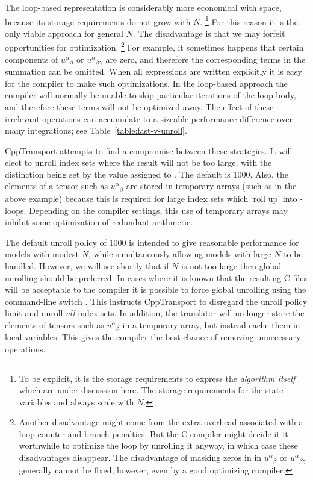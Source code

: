 \documentclass[11pt,a4paper]{article}
\renewcommand{\texttt}[1]{{\ttfamily\fontseries{l}\selectfont{#1}}}
\newcommand{\packagefont}{\sffamily}
\newcommand{\CppTransport}{{\packagefont CppTransport}}
\newcommand{\option}[1]{\texttt{\textbf{#1}}}
\newcommand\CC{C\nolinebreak\hspace{-.05em}\raisebox{.4ex}{\relsize{-3}{\textbf{+}}}\nolinebreak\hspace{-.10em}\raisebox{.4ex}{\relsize{-3}{\textbf{+}}}}
\begin{document}
\begin{itemize}
    The loop-based representation is considerably more economical with space,
    because its storage requirements do not grow with $N$.%
        \footnote{To be explicit, it is the storage requirements to
        express the \emph{algorithm itself} which are under discussion
        here. The storage requirements for the state variables
        \texttt{Sigma} and \texttt{dSigma}
        always scale with $N$.}
    For this reason
    it is the only viable approach for general $N$.
    The disadvantage is that we may forfeit opportunities
    for optimization.%
    	\footnote{Another disadvantage might come from
    	the extra overhead associated with a loop counter
    	and branch penalties. But the {\CC} compiler might
    	decide it it worthwhile to
    	optimize the loop by unrolling it anyway, in which
    	case these disadvantages disappear.
    	The disadvantage of masking zeros in
    	in ${u^\alpha}_\beta$ or ${u^\alpha}_{\beta\gamma}$
    	generally cannot be fixed, however, even by a good
    	optimizing compiler.}
    For example, it sometimes happens that
    certain components of ${u^\alpha}_\beta$
    or ${u^\alpha}_{\beta\gamma}$ are zero,
    and therefore the corresponding terms in the summation
    can be omitted.
    When all expressions are written explicitly
    it is easy for the compiler to make such
    optimizations.   
    In the loop-based approach
    the compiler will normally be unable to
    skip particular iterations of the loop body,
    and therefore these terms will not be optimized away.
    The effect of these irrelevant operations
    can accumulate to a sizeable performance
    difference over many integrations;
    see Table~\ref{table:fast-v-unroll}.
\end{itemize}

{\CppTransport} attempts to find a compromise between these
strategies.
It will elect to unroll index sets where the result will not
be too large,
with
the distinction being set by the value assigned to
\option{{-}{-}unroll-policy}. The default is 1000.
Also,
the elements of a tensor such as ${u^\alpha}_\beta$
are stored in temporary arrays (such as
\texttt{U2_TENSOR[][]} in the above example)
because this is required for
large index sets which `roll up' into
\texttt{for}-loops.
Depending on the compiler settings, this use
of temporary arrays may inhibit some
optimization of redundant arithmetic.

The default unroll policy of 1000 is intended to give reasonable
performance for models with modest $N$, while simultaneously
allowing models with large $N$ to be handled.
However, we will see shortly
that if $N$ is not too large then global unrolling should be preferred.
In cases where it is known that the resulting {\CC} files will be
acceptable to the compiler it is possible to force global
unrolling using the command-line switch
\option{{-}{-}fast}. This instructs
{\CppTransport} to disregard the unroll policy limit and unroll
\emph{all} index sets.
In addition, the translator will no longer store the elements of tensors such as
${u^\alpha}_\beta$ in a temporary array, but instead cache them
in \texttt{const} local variables.
This gives the compiler the best chance of removing unnecessary operations.
\end{document}
